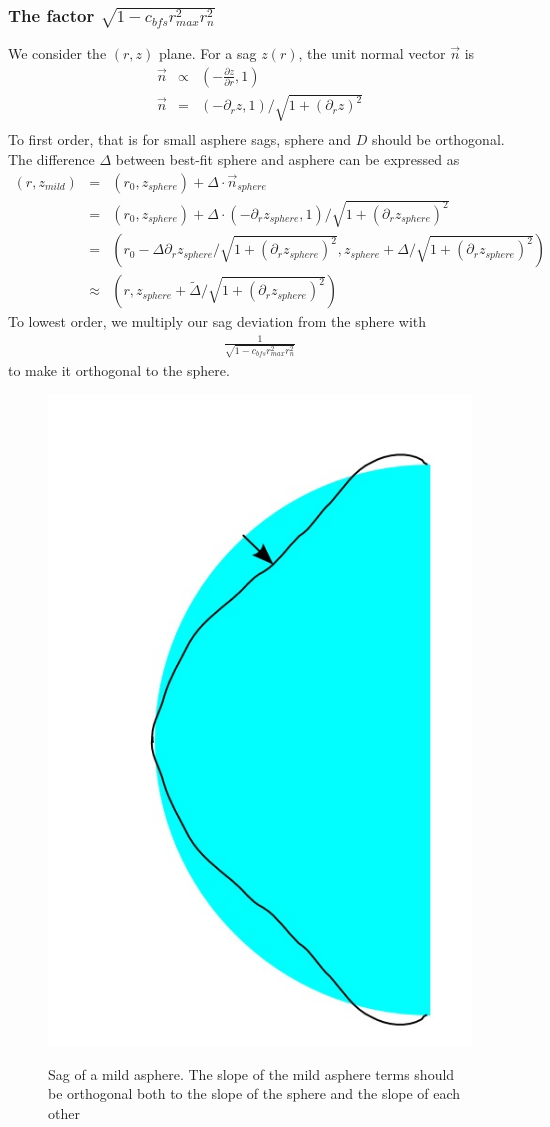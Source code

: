 \documentclass[10pt]{revtex4-1}
\renewcommand\r{r}
\newcommand\rmax{r_{max}}
\newcommand\rnorm{r_{n}}
\begin{document}
\subsubsection{The factor $\sqrt{1 - c_{bfs} \rmax^2 \rnorm^2}$}
We consider the $(\r,z)$ plane. For a sag $z(\r)$, the unit normal vector $\vec{n}$ is 
\begin{eqnarray}
  \vec{n} &\propto& (-\frac{\partial z}{\partial \r}, 1) \\
  \vec{n} &=& (-\partial_\r z, 1) / \sqrt{1+(\partial_\r z)^2} \\
	\end{eqnarray}
To first order, that is for small asphere sags, sphere and $D$ should be orthogonal. The difference $\Delta$ between best-fit sphere and asphere can be expressed as
\begin{eqnarray}
  (\r,z_{mild}) 
	&=& (\r_0,z_{sphere}) + \Delta \cdot \vec{n}_{sphere} \\
	&=& (\r_0,z_{sphere}) + \Delta \cdot (-\partial_\r z_{sphere}, 1) / \sqrt{1+(\partial_\r z_{sphere})^2} \\
	&=& (\r_0 - \Delta \partial_\r z_{sphere}/ \sqrt{1+(\partial_\r z_{sphere})^2},z_{sphere} + \Delta / \sqrt{1+(\partial_\r z_{sphere})^2}) \\
	&\approx& (\r,z_{sphere} + \tilde{\Delta} / \sqrt{1+(\partial_\r z_{sphere})^2})
\end{eqnarray}
To lowest order, we multiply our sag deviation from the sphere with
\begin{eqnarray}
  \frac{1}{\sqrt{1 - c_{bfs} \rmax^2 \rnorm^2}}
\end{eqnarray}
to make it orthogonal to the sphere.

\begin{figure}
  \centering
  \includegraphics[width=0.3\columnwidth]{mild_asphere.jpg}\\ %
  \caption{Sag of a mild asphere. The slope of the mild asphere terms should be orthogonal both to the slope of the sphere and the slope of each other}
  \label{fig:mild_asphere}
\end{figure}
\end{document}
